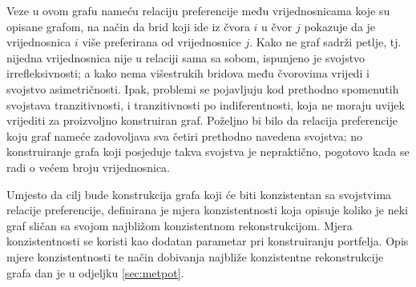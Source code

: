\documentclass[lmodern, utf8, diplomski, numeric]{fer}
\begin{document}
  Veze u ovom grafu nameću relaciju preferencije među vrijednosnicama koje su opisane grafom, na način da brid koji ide iz čvora $i$ u čvor $j$ pokazuje da je vrijednosnica $i$ više preferirana od vrijednosnice $j$.
  Kako ne graf sadrži petlje, tj. nijedna vrijednosnica nije u relaciji sama sa sobom, ispunjeno je svojstvo irrefleksivnosti; a kako nema višestrukih bridova među čvorovima vrijedi i svojstvo asimetričnosti.
  Ipak, problemi se pojavljuju kod prethodno spomenutih svojstava tranzitivnosti, i tranzitivnosti po indiferentnosti, koja ne moraju uvijek vrijediti za proizvoljno konstruiran graf.
  Poželjno bi bilo da relacija preferencije koju graf nameće zadovoljava sva četiri prethodno navedena svojstva; no konstruiranje grafa koji posjeduje takva svojstva je nepraktično, pogotovo kada se radi o većem broju vrijednosnica.
  
  Umjesto da cilj bude konstrukcija grafa koji će biti konzistentan sa svojstvima relacije preferencije, definirana je mjera konzistentnosti koja opisuje koliko je neki graf sličan sa svojom najbližom konzistentnom rekonstrukcijom.
  Mjera konzistentnosti se koristi kao dodatan parametar pri konstruiranju portfelja.
  Opis mjere konzistentnosti te način dobivanja najbliže konzistentne rekonstrukcije grafa dan je u odjeljku \ref{sec:metpot}.
  
  
\end{document}
